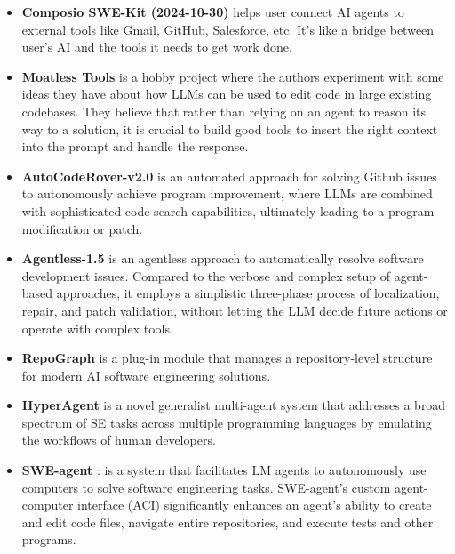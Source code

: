 \begin{itemize}
\item \textbf{Composio SWE-Kit (2024-10-30)} \cite{composio} helps user connect AI agents to external tools like Gmail, GitHub, Salesforce, etc. It’s like a bridge between user's AI and the tools it needs to get work done.

\item \textbf{Moatless Tools} \cite{moatless} is a hobby project where the authors experiment with some ideas they have about how LLMs can be used to edit code in large existing codebases. They believe that rather than relying on an agent to reason its way to a solution, it is crucial to build good tools to insert the right context into the prompt and handle the response.

\item \textbf{AutoCodeRover-v2.0} \cite{zhang2024autocoderover} is an automated approach for solving Github issues to autonomously achieve
program improvement, where LLMs are combined with sophisticated code search capabilities, ultimately leading to a program modification or patch.

\item \textbf{Agentless-1.5} \cite{xia2024agentless} is an agentless approach to automatically resolve software development issues. Compared to the verbose and complex setup of agent-based approaches, it employs a simplistic three-phase process of localization, repair, and patch validation, without letting the LLM decide future actions or operate with complex tools.

\item \textbf{RepoGraph} \cite{ouyang2024repograph} is a plug-in module that manages a repository-level structure for modern AI software engineering solutions.

\item \textbf{HyperAgent} \cite{phan2024hyperagent} is a novel generalist multi-agent system that addresses a broad spectrum of SE tasks across multiple programming languages by emulating the workflows of human developers.

\item \textbf{SWE-agent} \cite{yang2024swe}: is a system that facilitates LM agents to autonomously use computers to solve software engineering tasks. SWE-agent’s custom agent-computer interface
(ACI) significantly enhances an agent’s ability to create and edit code files, navigate entire repositories, and execute tests and other programs.
\end{itemize}
